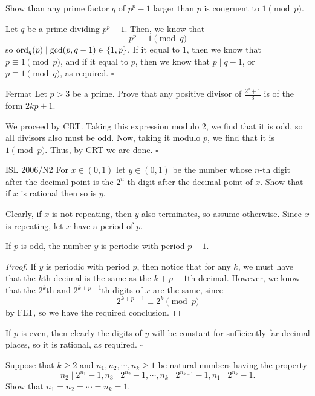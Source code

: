 \documentclass{article}
\begin{document}
\begin{problem}[5.9.2]{}
Show than any prime factor $q$ of $p^p - 1$ larger than $p$ is congruent to $1 \pmod{p}$.
\end{problem}

Let $q$ be a prime dividing $p^p-1$. Then, we know that \[p^p \equiv 1 \pmod{q}\] so $\operatorname{ord}_q(p) \mid \gcd(p, q-1) \in \{1, p\}$. If it equal to $1$, then we know that $p \equiv 1 \pmod{p}$, and if it equal to $p$, then we know that $p \mid q-1$, or $p \equiv 1 \pmod{q}$, as required. $\square$

\begin{problem}[5.9.3]{Fermat}
Let $p > 3$ be a prime. Prove that any positive divisor of $\tfrac{2^p+1}{3}$ is of the form $2kp + 1$.
\end{problem}

We proceed by CRT. Taking this expression modulo $2$, we find that it is odd, so all divisors also must be odd. Now, taking it modulo $p$, we find that it is $1 \pmod{p}$. Thus, by CRT we are done. $\square$

\begin{problem}[5.9.4]{ISL 2006/N2}
For $x \in (0, 1)$ let $y \in (0, 1)$ be the number whose $n$-th digit after the decimal point is the $2^n$-th digit after the decimal point of $x$. Show that if $x$ is rational then so is $y$.
\end{problem}

Clearly, if $x$ is not repeating, then $y$ also terminates, so assume otherwise. Since $x$ is repeating, let $x$ have a period of $p$.

\begin{claim*}
If $p$ is odd, the number $y$ is periodic with period $p-1$.
\end{claim*}
\begin{proof}
If $y$ is periodic with period $p$, then notice that for any $k$, we must have that the $k$th decimal is the same as the $k+p-1$th decimal. However, we know that the $2^k$th and $2^{k+p-1}$th digits of $x$ are the same, since \[2^{k+p-1} \equiv 2^k \pmod{p}\] by FLT, so we have the required conclusion. 
\end{proof}

If $p$ is even, then clearly the digits of $y$ will be constant for sufficiently far decimal places, so it is rational, as required. $\square$

\begin{problem}[5.9.5]{}
Suppose that $k \ge 2$ and $n_1, n_2, \cdots, n_k \ge 1$ be natural numbers having the property \[n_2 \mid 2^{n_1} - 1, n_3 \mid 2^{n_2} - 1, \cdots, n_k \mid 2^{n_{k-1}} - 1, n_1 \mid 2^{n_k}-1.\] Show that $n_1 = n_2 = \cdots = n_k = 1$.
\end{problem}
\end{document}
